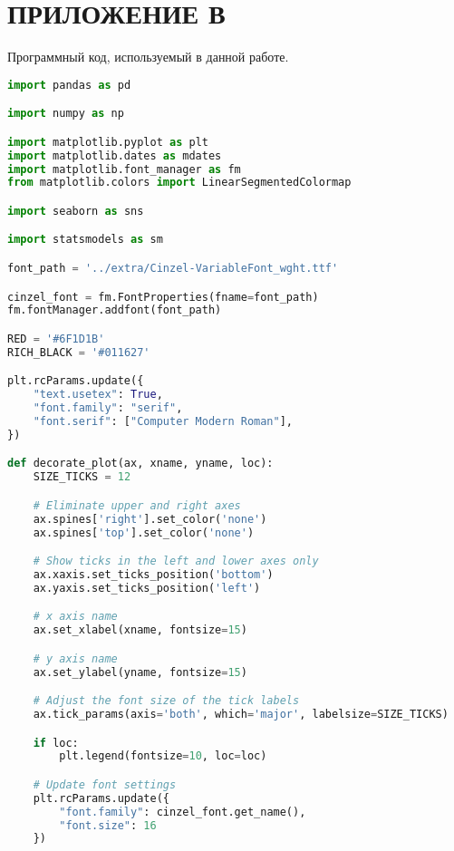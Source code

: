 \section*{ПРИЛОЖЕНИЕ В}



Программный код, используемый в данной работе.

\begin{center}
  \begin{lstlisting}[language=Python]
import pandas as pd

import numpy as np

import matplotlib.pyplot as plt
import matplotlib.dates as mdates
import matplotlib.font_manager as fm
from matplotlib.colors import LinearSegmentedColormap

import seaborn as sns

import statsmodels as sm

font_path = '../extra/Cinzel-VariableFont_wght.ttf'

cinzel_font = fm.FontProperties(fname=font_path)
fm.fontManager.addfont(font_path)

RED = '#6F1D1B'
RICH_BLACK = '#011627'

plt.rcParams.update({
    "text.usetex": True,
    "font.family": "serif",
    "font.serif": ["Computer Modern Roman"],
})

def decorate_plot(ax, xname, yname, loc):
    SIZE_TICKS = 12

    # Eliminate upper and right axes
    ax.spines['right'].set_color('none')
    ax.spines['top'].set_color('none')

    # Show ticks in the left and lower axes only
    ax.xaxis.set_ticks_position('bottom')
    ax.yaxis.set_ticks_position('left')

    # x axis name
    ax.set_xlabel(xname, fontsize=15)

    # y axis name
    ax.set_ylabel(yname, fontsize=15)

    # Adjust the font size of the tick labels
    ax.tick_params(axis='both', which='major', labelsize=SIZE_TICKS)

    if loc:
        plt.legend(fontsize=10, loc=loc)

    # Update font settings
    plt.rcParams.update({
        "font.family": cinzel_font.get_name(), 
        "font.size": 16
    })


\end{lstlisting}
\end{center}
